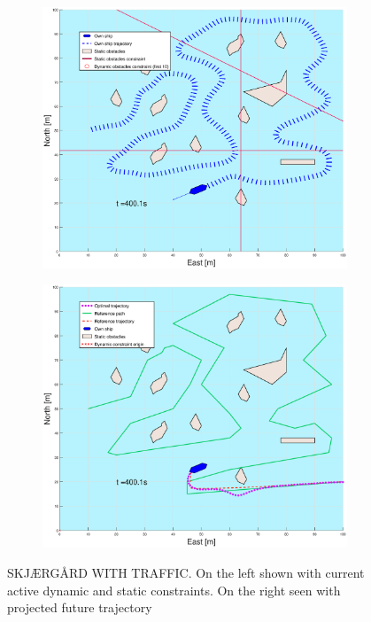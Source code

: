 \begin{figure}[ht]
\begin{subfigure}[b]{0.499\textwidth}
    \end{subfigure}
    \hfill
    \\
    \begin{subfigure}[b]{0.49\textwidth}
        \centering
        \includegraphics[width=\textwidth]{Images/Figures/skjergard_u_trafikk/_Simple_1fig1_time=400}
    \end{subfigure}
    \hfill
    \begin{subfigure}[b]{0.499\textwidth}
        \centering
        \includegraphics[width=\textwidth]{Images/Figures/skjergard_u_trafikk/_Simple_1fig999_time=400}
    \end{subfigure}
    \hfill
    \caption{SKJÆRGÅRD WITH TRAFFIC. On the left shown with current active dynamic and static constraints. On the right seen with projected future trajectory}
\end{figure}



